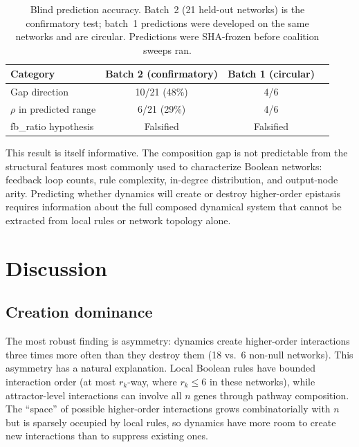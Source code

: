 \documentclass[11pt]{article}
\begin{document}
\begin{table}[t]
\centering
\caption{Blind prediction accuracy. Batch~2 (21 held-out networks) is
the confirmatory test; batch~1 predictions were developed on the same
networks and are circular. Predictions were SHA-frozen before
coalition sweeps ran.}
\label{tab:blind}
\begin{tabular}{lccc}
\toprule
Category & Batch 2 (confirmatory) & Batch 1 (circular) \\
\midrule
Gap direction & 10/21 (48\%) & 4/6 \\
$\rho$ in predicted range & 6/21 (29\%) & 4/6 \\
fb\_ratio hypothesis & Falsified & Falsified \\
\bottomrule
\end{tabular}
\end{table}

This result is itself informative. The composition gap is not
predictable from the structural features most commonly used to
characterize Boolean networks: feedback loop counts, rule complexity,
in-degree distribution, and output-node arity. Predicting whether
dynamics will create or destroy higher-order epistasis requires
information about the full composed dynamical system that cannot be
extracted from local rules or network topology alone.


\section{Discussion}
\label{sec:discussion}

\subsection{Creation dominance}

The most robust finding is asymmetry: dynamics create higher-order
interactions three times more often than they destroy them (18 vs.\ 6
non-null networks). This asymmetry has a natural explanation. Local
Boolean rules have bounded interaction order (at most $r_k$-way,
where $r_k \leq 6$ in these networks), while attractor-level
interactions can involve all $n$ genes through pathway composition.
The ``space'' of possible higher-order interactions grows
combinatorially with $n$ but is sparsely occupied by local rules,
so dynamics have more room to create new interactions than to
suppress existing ones.
\end{document}
